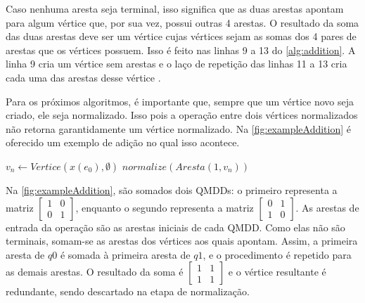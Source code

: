 Caso nenhuma aresta seja terminal, isso significa que as duas arestas apontam para algum vértice que, por sua vez, possui outras 4 arestas. O resultado da soma das duas arestas deve ser um vértice cujas vértices sejam as somas dos 4 pares de arestas que os vértices possuem. Isso é feito nas linhas 9 a 13 do \cref{alg:addition}. A linha 9 cria um vértice sem arestas e o laço de repetição das linhas 11 a 13 cria cada uma das arestas desse vértice \cite{miller2006qmdd}.

Para os próximos algoritmos, é importante que, sempre que um vértice novo seja criado, ele seja normalizado. Isso pois a operação entre dois vértices normalizados não retorna garantidamente um vértice normalizado. Na \cref{fig:exampleAddition} é oferecido um exemplo de adição no qual isso acontece.

\begin{algorithm}[H]
  \caption{Adição de Arestas}
  \label{alg:addition}

  $v_n \gets Vertice(x(e_0), \emptyset)$ \;
  \Return $normalize(Aresta(1, v_n))$

\end{algorithm}

Na \cref{fig:exampleAddition}, são somados dois QMDDs: o primeiro representa a matriz $\begin{bmatrix}1 & 0 \\ 0 & 1\end{bmatrix}$, enquanto o segundo representa a matriz $\begin{bmatrix}0 & 1 \\ 1 & 0\end{bmatrix}$. As arestas de entrada da operação são as arestas iniciais de cada QMDD. Como elas não são terminais, somam-se as arestas dos vértices aos quais apontam. Assim, a primeira aresta de $q0$ é somada à primeira aresta de $q1$, e o procedimento é repetido para as demais arestas. O resultado da soma é $\begin{bmatrix}1 & 1 \\ 1 & 1\end{bmatrix}$ e o vértice resultante é redundante, sendo descartado na etapa de normalização.

